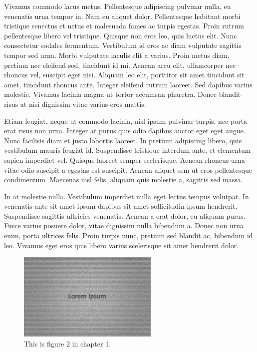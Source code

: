 Vivamus commodo lacus metus. Pellentesque adipiscing pulvinar nulla, eu venenatis urna tempor in. Nam eu aliquet dolor. Pellentesque habitant morbi tristique senectus et netus et malesuada fames ac turpis egestas. Proin rutrum pellentesque libero vel tristique. Quisque non eros leo, quis luctus elit. Nunc consectetur sodales fermentum. Vestibulum id eros ac diam vulputate sagittis tempor sed urna. Morbi vulputate iaculis elit a varius. Proin metus diam, pretium nec eleifend sed, tincidunt id mi. Aenean arcu elit, ullamcorper nec rhoncus vel, suscipit eget nisi. Aliquam leo elit, porttitor sit amet tincidunt sit amet, tincidunt rhoncus ante. Integer eleifend rutrum laoreet. Sed dapibus varius molestie. Vivamus lacinia magna ut tortor accumsan pharetra. Donec blandit risus at nisi dignissim vitae varius eros mattis. 


Etiam feugiat, neque ut commodo lacinia, nisl ipsum pulvinar turpis, nec porta erat risus non urna. Integer at purus quis odio dapibus auctor eget eget augue. Nunc facilisis diam et justo lobortis laoreet. In pretium adipiscing libero, quis vestibulum mauris feugiat id. Suspendisse tristique interdum ante, et elementum sapien imperdiet vel. Quisque laoreet semper scelerisque. Aenean rhoncus urna vitae odio suscipit a egestas est suscipit. Aenean aliquet sem ut eros pellentesque condimentum. Maecenas nisl felis, aliquam quis molestie a, sagittis sed massa. 

In at molestie nulla. Vestibulum imperdiet nulla eget lectus tempus volutpat. In venenatis ante sit amet ipsum dapibus sit amet sollicitudin ipsum hendrerit. Suspendisse sagittis ultricies venenatis. Aenean a erat dolor, eu aliquam purus. Fusce varius posuere dolor, vitae dignissim nulla bibendum a. Donec non urna enim, porta ultrices felis. Proin turpis nunc, pretium sed blandit ac, bibendum id leo. Vivamus eget eros quis libero varius scelerisque sit amet hendrerit dolor. 


\begin{figure}[]
\begin{center}
\includegraphics[width=0.6\textwidth]{01x02}
\end{center}
\caption{This is figure 2 in chapter 1.}
\end{figure}

